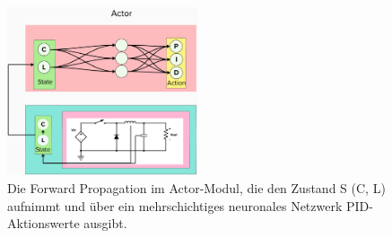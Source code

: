 \begin{figure}[htbp]
\centering
\includegraphics[width=0.5\textwidth]{3Experiment/2Experiment/2Actor.png}
\caption{Die Forward Propagation im Actor-Modul, die den Zustand S (C, L) aufnimmt und über ein mehrschichtiges neuronales Netzwerk PID-Aktionswerte ausgibt.}
\label{fig:actor_decision_making}
\end{figure}


